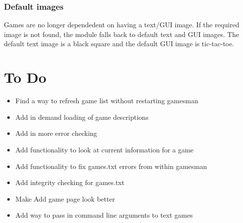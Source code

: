 \documentclass[11pt]{article}
\begin{document}
\subsubsection{Default images}
Games are no longer dependedent on having a text/GUI image. If the required image is not found, the module falls back to default text and GUI images. The default text image is a black square and the default GUI image is tic-tac-toe.

\section{To Do}
\begin{itemize}
\item Find a way to refresh game list without restarting gamesman
\item Add in demand loading of game descriptions
\item Add in more error checking
\item Add functionality to look at current information for a game
\item Add functionality to fix games.txt errors from within gamesman
\item Add integrity checking for games.txt
\item Make Add game page look better
\item Add way to pass in command line arguments to text games

\end{itemize}
\end{document}
